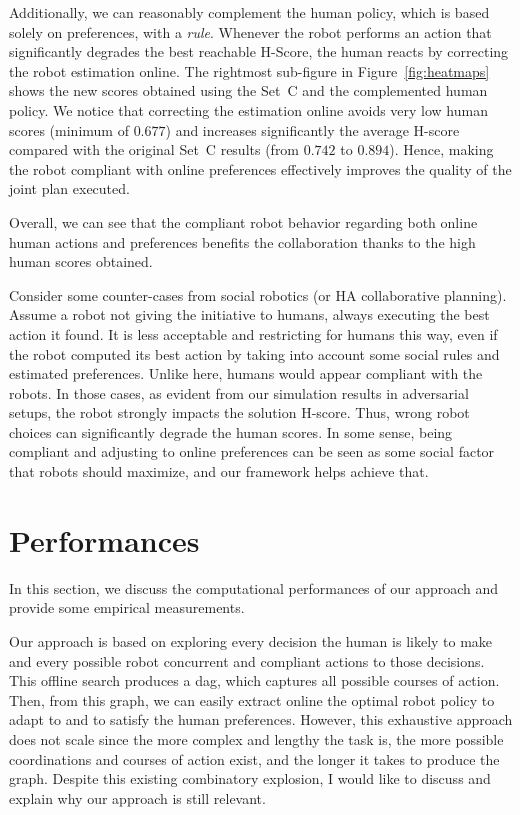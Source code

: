 Additionally, we can reasonably complement the human policy, which is based solely on preferences, with a \textit{rule}. Whenever the robot performs an action that significantly degrades the best reachable H-Score, the human reacts by correcting the robot estimation online.
The rightmost sub-figure in Figure~\ref{fig:heatmaps} shows the new scores obtained using the Set~C and the complemented human policy. 
We notice that correcting the estimation online avoids very low human scores (minimum of $0.677$) and increases significantly the average H-score compared with the original Set~C results (from $0.742$ to $0.894$). Hence, making the robot compliant with online preferences effectively improves the quality of the joint plan executed.


Overall, we can see that the compliant robot behavior regarding both online human actions and preferences benefits the collaboration thanks to the high human scores obtained.

Consider some counter-cases from social robotics (or HA collaborative planning). Assume a robot not giving the initiative to humans, always executing the best action it found. 
It is less acceptable and restricting for humans this way, even if the robot computed its best action by taking into account some social rules and estimated preferences. 
Unlike here, humans would appear compliant with the robots. 
In those cases, as evident from our simulation results in adversarial setups, the robot strongly impacts the solution H-score. Thus, wrong robot choices can significantly degrade the human scores. In some sense, being compliant and adjusting to online preferences can be seen as some social factor that robots should maximize, and our framework helps achieve that.

\section{Performances}


In this section, we discuss the computational performances of our approach and provide some empirical measurements. 

Our approach is based on exploring every decision the human is likely to make and every possible robot concurrent and compliant actions to those decisions. 
This offline search produces a \acrfull{dag}, which captures all possible courses of action. Then, from this graph, we can easily extract online the optimal robot policy to adapt to and to satisfy the human preferences. However, this exhaustive approach does not scale since the more complex and lengthy the task is, the more possible coordinations and courses of action exist, and the longer it takes to produce the graph. Despite this existing combinatory explosion, I would like to discuss and explain why our approach is still relevant.

